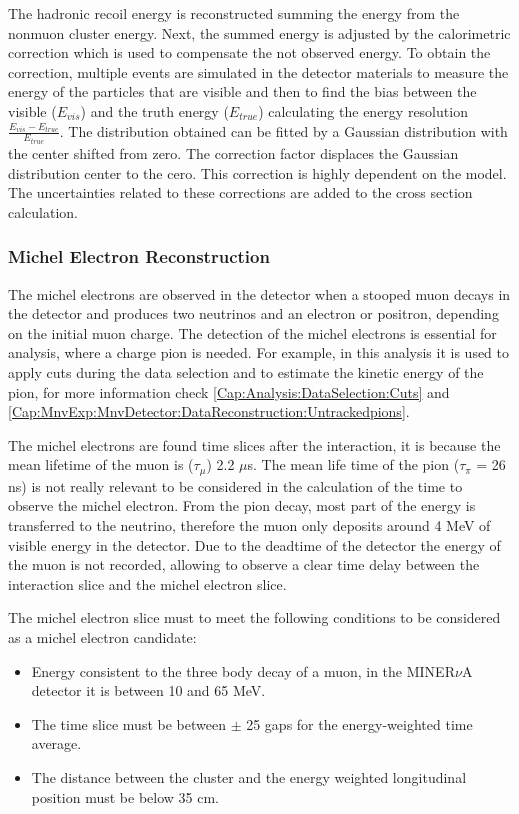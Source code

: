 The hadronic recoil energy is reconstructed summing the energy from the nonmuon cluster energy. Next, the summed energy is adjusted by the calorimetric correction which is used to compensate the not observed energy. To obtain the correction, multiple events are simulated in the detector materials to measure the energy of the particles that are visible and then to find the bias between the visible ($E_{vis}$) and the truth energy ($E_{true}$) calculating the energy resolution $\frac{E_{vis} - E_{true}}{E_{true}}$. The distribution obtained can be fitted by a Gaussian distribution with the center shifted from zero. The correction factor displaces the Gaussian distribution center to the cero. This correction is highly dependent on the model. The uncertainties related to these corrections are added to the cross section calculation. 

    \subsubsection{Michel Electron Reconstruction}
\label{Cap:MnvExp:MnvDetector:DataReconstruction:MichelElectron}

The michel electrons are observed in the detector when a stooped muon decays in the detector and produces two neutrinos and an electron or positron, depending on the initial muon charge. The detection of the michel electrons is essential for analysis, where a charge pion is needed. For example, in this analysis it is used to apply cuts during the data selection and to estimate the kinetic energy of the pion, for more information check \ref{Cap:Analysis:DataSelection:Cuts} and \ref{Cap:MnvExp:MnvDetector:DataReconstruction:Untrackedpions}. 

The michel electrons are found time slices after the interaction, it is because the mean lifetime of the muon is ($\tau_\mu$) 2.2 $\mu$s. The mean life time of the pion ($\tau_\pi$ = 26 ns) is not really relevant to be considered in the calculation of the time to observe the michel electron. From the pion decay, most part of the energy is transferred to the neutrino, therefore the muon only deposits around 4 MeV of visible energy in the detector. Due to the deadtime \cite{MINERvA} of the detector the energy of the muon is not recorded, allowing to observe a clear time delay between the interaction slice and the michel electron slice. 

The michel electron slice must to meet the following conditions to be considered as a michel electron candidate:
\begin{itemize}
    \item Energy consistent to the three body decay of a muon, in the MINER$\nu$A detector it is between 10 and 65 MeV. 
    \item The time slice must be between $\pm$ 25 gaps for the energy-weighted time average. 
    \item The distance between the cluster and the energy weighted longitudinal position must be below 35 cm. 
\end{itemize}

